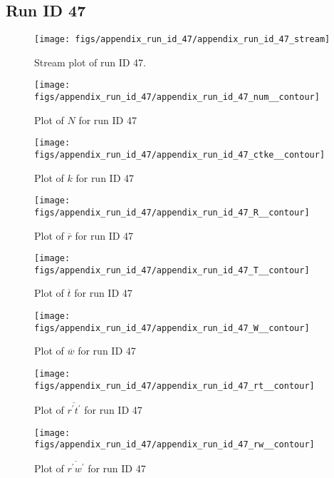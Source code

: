 \subsection{Run ID 47}
\begin{figure}[H]
\centering
\texttt{[image: figs/appendix\_run\_id\_47/appendix\_run\_id\_47\_stream]}
\caption{Stream plot of run ID 47.}
\label{fig:appendix_run_id_47_stream}
\end{figure}


\begin{figure}[H]
\centering
\texttt{[image: figs/appendix\_run\_id\_47/appendix\_run\_id\_47\_num\_\_contour]}
\caption{Plot of $N$ for run ID 47}
\label{fig:appendix_run_id_47_num__contour}
\end{figure}


\begin{figure}[H]
\centering
\texttt{[image: figs/appendix\_run\_id\_47/appendix\_run\_id\_47\_ctke\_\_contour]}
\caption{Plot of $k$ for run ID 47}
\label{fig:appendix_run_id_47_ctke__contour}
\end{figure}


\begin{figure}[H]
\centering
\texttt{[image: figs/appendix\_run\_id\_47/appendix\_run\_id\_47\_R\_\_contour]}
\caption{Plot of $\overline{r}$ for run ID 47}
\label{fig:appendix_run_id_47_R__contour}
\end{figure}


\begin{figure}[H]
\centering
\texttt{[image: figs/appendix\_run\_id\_47/appendix\_run\_id\_47\_T\_\_contour]}
\caption{Plot of $\overline{t}$ for run ID 47}
\label{fig:appendix_run_id_47_T__contour}
\end{figure}


\begin{figure}[H]
\centering
\texttt{[image: figs/appendix\_run\_id\_47/appendix\_run\_id\_47\_W\_\_contour]}
\caption{Plot of $\overline{w}$ for run ID 47}
\label{fig:appendix_run_id_47_W__contour}
\end{figure}


\begin{figure}[H]
\centering
\texttt{[image: figs/appendix\_run\_id\_47/appendix\_run\_id\_47\_rt\_\_contour]}
\caption{Plot of $\overline{r^\prime t^\prime}$ for run ID 47}
\label{fig:appendix_run_id_47_rt__contour}
\end{figure}


\begin{figure}[H]
\centering
\texttt{[image: figs/appendix\_run\_id\_47/appendix\_run\_id\_47\_rw\_\_contour]}
\caption{Plot of $\overline{r^\prime w^\prime}$ for run ID 47}
\label{fig:appendix_run_id_47_rw__contour}
\end{figure}



